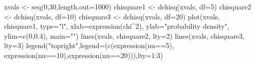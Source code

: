 \begin{Schunk}
\begin{Sinput}
 xvals <- seq(0,30,length.out=1000)
 chisquare1 <- dchisq(xvals, df=5)
 chisquare2 <- dchisq(xvals, df=10)
 chisquare3 <- dchisq(xvals, df=20)
 plot(xvals, chisquare1, type="l", xlab=expression(chi^2), ylab="probability density",  ylim=c(0,0.4), main="")
 lines(xvals, chisquare2, lty=2)
 lines(xvals, chisquare3, lty=3)
 legend("topright",legend=(c(expression(nu==5), expression(nu==10),expression(nu==20))),lty=1:3)
\end{Sinput}
\end{Schunk}
